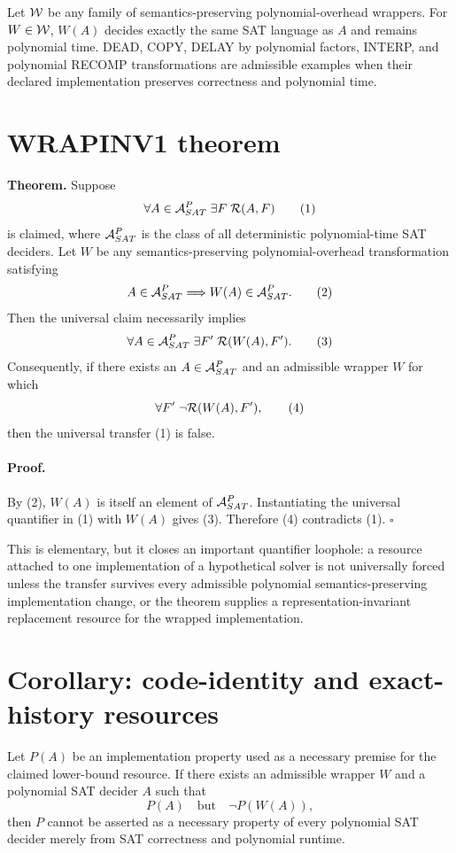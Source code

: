 \documentclass[11pt]{article}
\begin{document}
Let \({\cal W}\) be any family of semantics-preserving polynomial-overhead wrappers. For \(W\in{\cal W}\), \(W(A)\) decides exactly the same SAT language as \(A\) and remains polynomial time. DEAD, COPY, DELAY by polynomial factors, INTERP, and polynomial RECOMP transformations are admissible examples when their declared implementation preserves correctness and polynomial time.

\section*{WRAPINV1 theorem}
\textbf{Theorem.} Suppose
\[
\forall A\in{\cal A}_{SAT}^{P}\;\exists F\;{\cal R}(A,F)
\tag{1}
\]
is claimed, where \({\cal A}_{SAT}^{P}\) is the class of all deterministic polynomial-time SAT deciders. Let \(W\) be any semantics-preserving polynomial-overhead transformation satisfying
\[
A\in{\cal A}_{SAT}^{P}\Longrightarrow W(A)\in{\cal A}_{SAT}^{P}.
\tag{2}
\]
Then the universal claim necessarily implies
\[
\forall A\in{\cal A}_{SAT}^{P}\;\exists F'\;{\cal R}(W(A),F').
\tag{3}
\]
Consequently, if there exists an \(A\in{\cal A}_{SAT}^{P}\) and an admissible wrapper \(W\) for which
\[
\forall F'\;\neg{\cal R}(W(A),F'),
\tag{4}
\]
then the universal transfer (1) is false.

\paragraph{Proof.}
By (2), \(W(A)\) is itself an element of \({\cal A}_{SAT}^{P}\). Instantiating the universal quantifier in (1) with \(W(A)\) gives (3). Therefore (4) contradicts (1). \(\square\)

This is elementary, but it closes an important quantifier loophole: a resource attached to one implementation of a hypothetical solver is not universally forced unless the transfer survives every admissible polynomial semantics-preserving implementation change, or the theorem supplies a representation-invariant replacement resource for the wrapped implementation.

\section*{Corollary: code-identity and exact-history resources}
Let \(P(A)\) be an implementation property used as a necessary premise for the claimed lower-bound resource. If there exists an admissible wrapper \(W\) and a polynomial SAT decider \(A\) such that
\[
P(A)\quad\text{but}\quad \neg P(W(A)),
\]
then \(P\) cannot be asserted as a necessary property of every polynomial SAT decider merely from SAT correctness and polynomial runtime.
\end{document}
